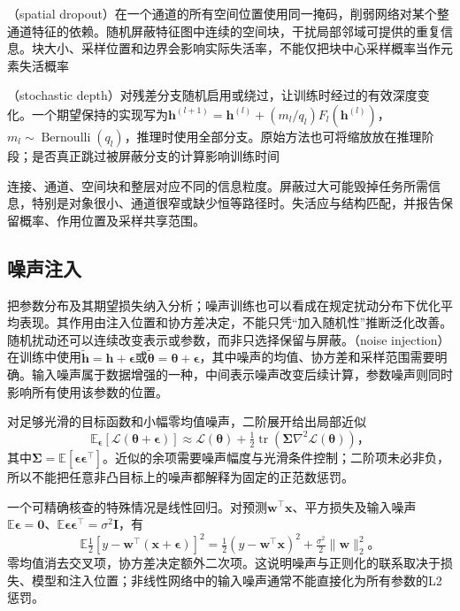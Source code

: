 （spatial dropout）在一个通道的所有空间位置使用同一掩码，削弱网络对某个整通道特征的依赖。随机屏蔽特征图中连续的空间块，干扰局部邻域可提供的重复信息。块大小、采样位置和边界会影响实际失活率，不能仅把块中心采样概率当作元素失活概率

（stochastic depth）对残差分支随机启用或绕过，让训练时经过的有效深度变化。一个期望保持的实现写为$\bm h^{(l+1)}=\bm h^{(l)}+(m_l/q_l)F_l(\bm h^{(l)})$，$m_l\sim\operatorname{Bernoulli}(q_l)$，推理时使用全部分支。原始方法也可将缩放放在推理阶段；是否真正跳过被屏蔽分支的计算影响训练时间

连接、通道、空间块和整层对应不同的信息粒度。屏蔽过大可能毁掉任务所需信息，特别是对象很小、通道很窄或缺少恒等路径时。失活应与结构匹配，并报告保留概率、作用位置及采样共享范围。

\subsection{噪声注入}
\label{sec:generalization-noise}

把参数分布及其期望损失纳入分析；噪声训练也可以看成在规定扰动分布下优化平均表现。其作用由注入位置和协方差决定，不能只凭“加入随机性”推断泛化改善。随机扰动还可以连续改变表示或参数，而非只选择保留与屏蔽。（noise injection）在训练中使用$\tilde{\bm h}=\bm h+\bm\epsilon$或$\tilde{\bm\theta}=\bm\theta+\bm\epsilon$，其中噪声的均值、协方差和采样范围需要明确。输入噪声属于数据增强的一种，中间表示噪声改变后续计算，参数噪声则同时影响所有使用该参数的位置。

对足够光滑的目标函数和小幅零均值噪声，二阶展开给出局部近似
\begin{equation}
  \mathbb E_{\bm\epsilon}[\mathcal L(\bm\theta+\bm\epsilon)]
  \approx\mathcal L(\bm\theta)+\tfrac12
      \operatorname{tr}(\bm\Sigma\nabla^2\mathcal L(\bm\theta))\text{，}
  \label{eq:generalization-noise-expansion}
\end{equation}
其中$\bm\Sigma=\mathbb E[\bm\epsilon\bm\epsilon^{\top}]$。近似的余项需要噪声幅度与光滑条件控制；二阶项未必非负，所以不能把任意非凸目标上的噪声都解释为固定的正范数惩罚。

一个可精确核查的特殊情况是线性回归。对预测$\bm w^{\top}\bm x$、平方损失及输入噪声$\mathbb E\bm\epsilon=\bm0$、$\mathbb E\bm\epsilon\bm\epsilon^{\top}=\sigma^2\bm I$，有
\begin{equation}
  \mathbb E\tfrac12[y-\bm w^{\top}(\bm x+\bm\epsilon)]^2
  =\tfrac12(y-\bm w^{\top}\bm x)^2+\tfrac{\sigma^2}{2}\lVert\bm w\rVert_2^2\text{。}
  \label{eq:generalization-linear-noise}
\end{equation}
零均值消去交叉项，协方差决定额外二次项。这说明噪声与正则化的联系取决于损失、模型和注入位置；非线性网络中的输入噪声通常不能直接化为所有参数的L2惩罚。


